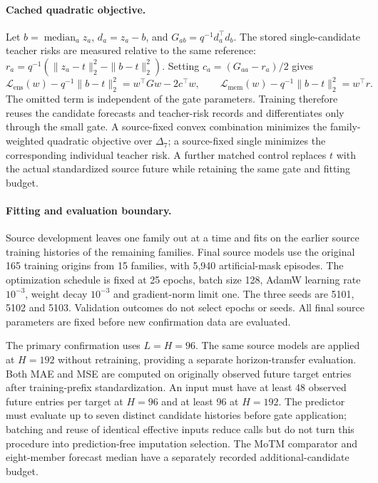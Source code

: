 \paragraph{Cached quadratic objective.}
Let $b=\operatorname{median}_a z_a$, $d_a=z_a-b$, and $G_{ab}=q^{-1}d_a^\top d_b$. The stored single-candidate teacher risks are measured relative to the same reference:
$r_a=q^{-1}(\|z_a-t\|_2^2-\|b-t\|_2^2)$.
Setting $c_a=(G_{aa}-r_a)/2$ gives
\begin{equation}
 \mathcal{L}_{\mathrm{ens}}(w)-q^{-1}\|b-t\|_2^2
 =w^\top G w-2c^\top w,
 \qquad
 \mathcal{L}_{\mathrm{mem}}(w)-q^{-1}\|b-t\|_2^2=w^\top r.
 \label{eq:gate_quadratic}
\end{equation}
The omitted term is independent of the gate parameters. Training therefore reuses the candidate forecasts and teacher-risk records and differentiates only through the small gate. A source-fixed convex combination minimizes the family-weighted quadratic objective over $\Delta_7$; a source-fixed single minimizes the corresponding individual teacher risk. A further matched control replaces $t$ with the actual standardized source future while retaining the same gate and fitting budget.

\paragraph{Fitting and evaluation boundary.}
Source development leaves one family out at a time and fits on the earlier source training histories of the remaining families. Final source models use the original 165 training origins from 15 families, with 5,940 artificial-mask episodes. The optimization schedule is fixed at 25 epochs, batch size 128, AdamW learning rate $10^{-3}$, weight decay $10^{-3}$ and gradient-norm limit one. The three seeds are 5101, 5102 and 5103. Validation outcomes do not select epochs or seeds. All final source parameters are fixed before new confirmation data are evaluated.

The primary confirmation uses $L=H=96$. The same source models are applied at $H=192$ without retraining, providing a separate horizon-transfer evaluation. Both MAE and MSE are computed on originally observed future target entries after training-prefix standardization. An input must have at least 48 observed future entries per target at $H=96$ and at least 96 at $H=192$. The predictor must evaluate up to seven distinct candidate histories before gate application; batching and reuse of identical effective inputs reduce calls but do not turn this procedure into prediction-free imputation selection. The MoTM comparator and eight-member forecast median have a separately recorded additional-candidate budget.

